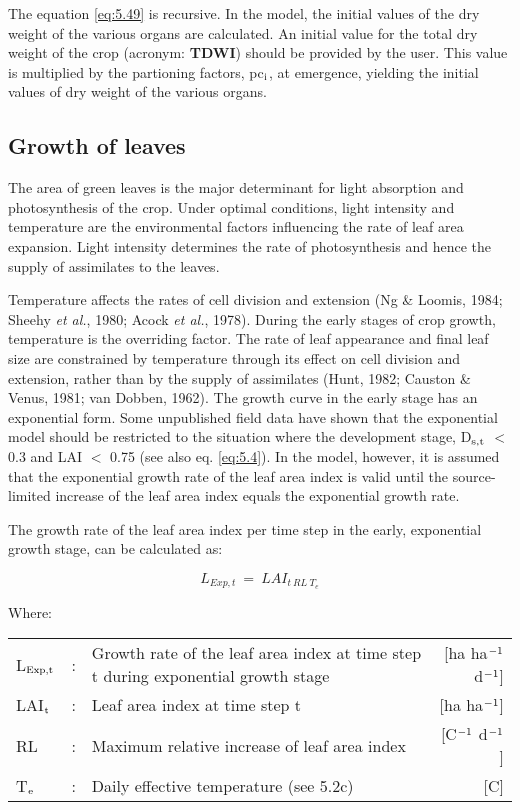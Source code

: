 The equation \ref{eq:5.49} is recursive. In the model, the initial values of the dry weight of the
various organs are calculated. An initial value for the total dry weight of the crop
(acronym: {\bf TDWI}) should be provided by the user. This value is multiplied by the
partioning factors, pc$_{{\rm i}}$, at emergence, yielding the initial values of dry weight of the
various organs.

\subsection{Growth of leaves}
\label{sec:growthofleaves}
The area of green leaves is the major determinant for light absorption and photosynthesis
of the crop. Under optimal conditions, light intensity and temperature are the environmental factors influencing the rate of leaf area expansion. Light intensity determines the
rate of photosynthesis and hence the supply of assimilates to the leaves.

Temperature affects the rates of cell division and extension (Ng \& Loomis, 1984; Sheehy
{\it et al.}, 1980; Acock {\it et al.}, 1978). During the early stages of crop growth, temperature is
the overriding factor. The rate of leaf appearance and final leaf size are constrained by
temperature through its effect on cell division and extension, rather than by the supply of
assimilates (Hunt, 1982; Causton \& Venus, 1981; van Dobben, 1962). The growth curve
in the early stage has an exponential form. Some unpublished field data have shown that
the exponential model should be restricted to the situation where the development stage, 
D$_{{\rm s,t}}$ $<$ 0.3 and LAI $<$ 0.75 (see also eq. \ref{eq:5.4}). In the model, however, it is assumed that
the exponential growth rate of the leaf area index is valid until the source-limited increase
of the leaf area index equals the exponential growth rate.

The growth rate of the leaf area index per time step in the early, exponential growth
stage, can be calculated as:

\begin{equation}
L _{Exp,t} ~=~LAI _{{t~RL~T}_{e}}
\end{equation}

Where:\\[5pt]
\begin{tabularx}{\textwidth}{llXr}
	L$_{{\rm Exp,t}}$ &:& Growth rate of the leaf area index at time step t
	during exponential growth stage   &    [ha ha$^{{\rm -1}}$ d$^{{\rm -1}}$]\\
	LAI$_{{\rm t}}$ &:& Leaf area index at time step t    &
	[ha ha$^{{\rm -1}}$]\\
	RL &:& Maximum relative increase of leaf area index   &
	[\degrees C$^{{\rm -1}}$ d$^{{\rm -1}}$]\\
	T$_{{\rm e}}$ &:& Daily effective temperature (see 5.2c)   &
	[\degrees C]\\
\end{tabularx}

